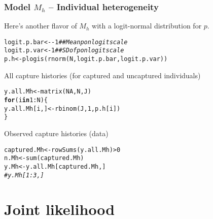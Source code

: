 \documentclass[color=usenames,dvipsnames]{beamer}\usepackage[]{graphicx}\usepackage[]{color}
\makeatletter
\newcommand{\hlnum}[1]{\textcolor[rgb]{0.69,0.494,0}{#1}}%
\newcommand{\hlcom}[1]{\textcolor[rgb]{0.514,0.506,0.514}{\textit{#1}}}%
\newcommand{\hlopt}[1]{\textcolor[rgb]{0,0,0}{#1}}%
\newcommand{\hlstd}[1]{\textcolor[rgb]{0,0,0}{#1}}%
\newcommand{\hlkwa}[1]{\textcolor[rgb]{0,0,0}{\textbf{#1}}}%
\newcommand{\hlkwb}[1]{\textcolor[rgb]{0,0.341,0.682}{#1}}%
\newcommand{\hlkwd}[1]{\textcolor[rgb]{0.004,0.004,0.506}{#1}}%
\newenvironment{kframe}{%
 \def\at@end@of@kframe{}%
 \ifinner\ifhmode%
  \def\at@end@of@kframe{\end{minipage}}%
  \begin{minipage}{\columnwidth}%
 \fi\fi%
 \def\FrameCommand##1{\hskip\@totalleftmargin \hskip-\fboxsep
 \colorbox{shadecolor}{##1}\hskip-\fboxsep
     \hskip-\linewidth \hskip-\@totalleftmargin \hskip\columnwidth}%
 \MakeFramed {\advance\hsize-\width
   \@totalleftmargin\z@ \linewidth\hsize
   \@setminipage}}%
 {\par\unskip\endMakeFramed%
 \at@end@of@kframe}
\newenvironment{knitrout}{}{} %
\makeatother
\begin{document}
\begin{frame}[fragile]
  \frametitle{Model $M_h$ -- Individual heterogeneity}
  Here's another flavor of $M_h$ with a logit-normal distribution for
  $p$.  
\begin{knitrout}\scriptsize
{}\color{fgcolor}\begin{kframe}
\begin{alltt}
\hlstd{logit.p.bar} \hlkwb{<-} \hlopt{-}\hlnum{1}  \hlcom{## Mean p on logit scale}
\hlstd{logit.p.var} \hlkwb{<-} \hlnum{1}   \hlcom{## SD of p on logit scale}
\hlstd{p.h} \hlkwb{<-} \hlkwd{plogis}\hlstd{(}\hlkwd{rnorm}\hlstd{(N, logit.p.bar, logit.p.var))}
\end{alltt}
\end{kframe}
\end{knitrout}
  \pause
  \vfill
  All capture histories (for captured and uncaptured individuals)
  \vspace{-6pt}
\begin{knitrout}\scriptsize
{}\color{fgcolor}\begin{kframe}
\begin{alltt}
\hlstd{y.all.Mh} \hlkwb{<-} \hlkwd{matrix}\hlstd{(}\hlnum{NA}\hlstd{, N, J)}
\hlkwa{for}\hlstd{(i} \hlkwa{in} \hlnum{1}\hlopt{:}\hlstd{N) \{}
    \hlstd{y.all.Mh[i,]} \hlkwb{<-} \hlkwd{rbinom}\hlstd{(J,} \hlnum{1}\hlstd{, p.h[i])}
\hlstd{\}}
\end{alltt}
\end{kframe}
\end{knitrout}
  \pause
  \vfill
  Observed capture histories (data)
  \vspace{-6pt}
\begin{knitrout}\scriptsize
{}\color{fgcolor}\begin{kframe}
\begin{alltt}
\hlstd{captured.Mh} \hlkwb{<-} \hlkwd{rowSums}\hlstd{(y.all.Mh)}\hlopt{>}\hlnum{0}
\hlstd{n.Mh} \hlkwb{<-} \hlkwd{sum}\hlstd{(captured.Mh)}
\hlstd{y.Mh} \hlkwb{<-} \hlstd{y.all.Mh[captured.Mh,]}
\hlcom{#y.Mh[1:3,]}
\end{alltt}
\end{kframe}
\end{knitrout}
\end{frame}





\section{Joint likelihood}
\end{document}
